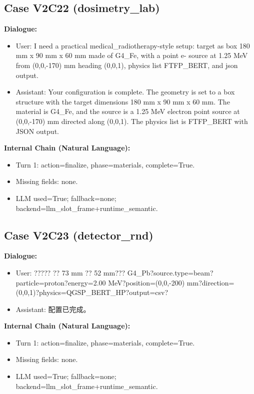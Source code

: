 \documentclass[11pt]{ctexart}
\begin{document}
\subsection{Case V2C22 (dosimetry\_lab)}
\textbf{Dialogue:}
\begin{itemize}
\item User: I need a practical medical\_radiotherapy-style setup: target as box 180 mm x 90 mm x 60 mm made of G4\_Fe, with a point e- source at 1.25 MeV from (0,0,-170) mm heading (0,0,1), physics list FTFP\_BERT, and json output.
\item Assistant: Your configuration is complete. The geometry is set to a box structure with the target dimensions 180 mm x 90 mm x 60 mm. The material is G4\_Fe, and the source is a 1.25 MeV electron point source at (0,0,-170) mm directed along (0,0,1). The physics list is FTFP\_BERT with JSON output.
\end{itemize}
\textbf{Internal Chain (Natural Language):}
\begin{itemize}
\item Turn 1: action=finalize, phase=materials, complete=True.
\item Missing fields: none.
\item LLM used=True; fallback=none; backend=llm\_slot\_frame+runtime\_semantic.
\end{itemize}
\subsection{Case V2C23 (detector\_rnd)}
\textbf{Dialogue:}
\begin{itemize}
\item User: ????? ?? 73 mm ?? 52 mm??? G4\_Pb?source.type=beam?particle=proton?energy=2.00 MeV?position=(0,0,-200) mm?direction=(0,0,1)?physics=QGSP\_BERT\_HP?output=csv?
\item Assistant: 配置已完成。
\end{itemize}
\textbf{Internal Chain (Natural Language):}
\begin{itemize}
\item Turn 1: action=finalize, phase=materials, complete=True.
\item Missing fields: none.
\item LLM used=True; fallback=none; backend=llm\_slot\_frame+runtime\_semantic.
\end{itemize}
\end{document}
